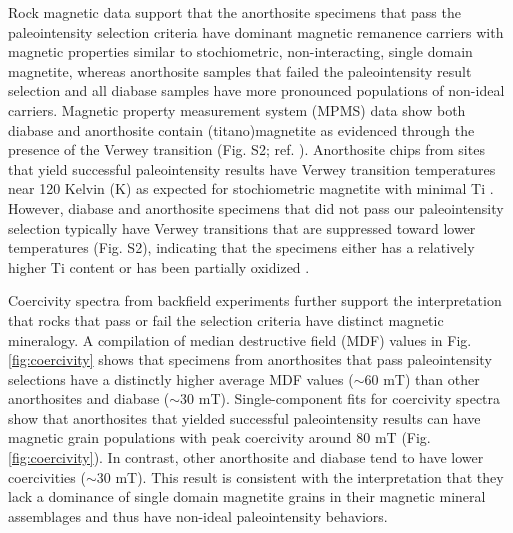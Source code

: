 \documentclass[9pt,twocolumn,twoside,lineno]{pnas-new}
\begin{document}
Rock magnetic data support that the anorthosite specimens that pass the paleointensity selection criteria have dominant magnetic remanence carriers with magnetic properties similar to stochiometric, non-interacting, single domain magnetite, whereas anorthosite samples that failed the paleointensity result selection and all diabase samples have more pronounced populations of non-ideal carriers. Magnetic property measurement system (MPMS) data show both diabase and anorthosite contain (titano)magnetite as evidenced through the presence of the Verwey transition (Fig. S2; ref. \citealp{Verwey1939a, Feinberg2015a}). Anorthosite chips from sites that yield successful paleointensity results have Verwey transition temperatures near 120 Kelvin (K) as expected for stochiometric magnetite with minimal Ti \cite{Ozdemir1993a}. However, diabase and anorthosite specimens that did not pass our paleointensity selection typically have Verwey transitions that are suppressed toward lower temperatures (Fig. S2), indicating that the specimens either has a relatively higher Ti content or has been partially oxidized \cite{Ozdemir1993a}. 
 
Coercivity spectra from backfield experiments further support the interpretation that rocks that pass or fail the selection criteria have distinct magnetic mineralogy. A compilation of median destructive field (MDF) values in Fig. \ref{fig:coercivity} shows that specimens from anorthosites that pass paleointensity selections have a distinctly higher average MDF values ($\sim$60 mT) than other anorthosites and diabase ($\sim$30 mT). Single-component fits for coercivity spectra \cite{Maxbauer2016a} show that anorthosites that yielded successful paleointensity results can have magnetic grain populations with peak coercivity around 80 mT (Fig. \ref{fig:coercivity}). In contrast, other anorthosite and diabase tend to have lower coercivities ($\sim$30 mT). This result is consistent with the interpretation that they lack a dominance of single domain magnetite grains in their magnetic mineral assemblages and thus have non-ideal paleointensity behaviors.
\end{document}
